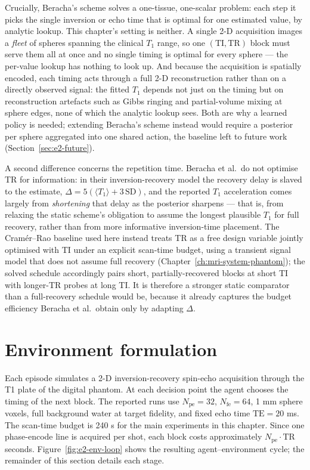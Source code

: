 Crucially, Beracha's scheme solves a one-tissue, one-scalar problem: each step
it picks the single inversion or echo time that is optimal for one estimated
value, by analytic lookup. This chapter's setting is neither. A single 2-D
acquisition images a \emph{fleet} of spheres spanning the clinical $T_1$ range,
so one $(\mathrm{TI},\mathrm{TR})$ block must serve them all at once and no
single timing is optimal for every sphere --- the per-value lookup has nothing
to look up. And because the acquisition is spatially encoded, each timing acts
through a full 2-D reconstruction rather than on a directly observed signal:
the fitted $T_1$ depends not just on the timing but on reconstruction artefacts
such as Gibbs ringing and partial-volume mixing at sphere edges, none of which
the analytic lookup sees. Both are why a learned policy is needed; extending
Beracha's scheme instead would require a posterior per sphere aggregated into
one shared action, the baseline left to future work (Section~\ref{sec:e2-future}).

A second difference concerns the repetition time. Beracha et al.\ do not
optimise TR for information: in their inversion-recovery model the recovery
delay is slaved to the estimate, $\Delta = 5(\langle T_1\rangle + 3\,\mathrm{SD})$,
and the reported $T_1$ acceleration comes largely from \emph{shortening} that
delay as the posterior sharpens --- that is, from relaxing the static scheme's
obligation to assume the longest plausible $T_1$ for full recovery, rather than
from more informative inversion-time placement. The Cram\'er--Rao baseline used
here instead treats TR as a free design variable jointly optimised with TI under
an explicit scan-time budget, using a transient signal model that does not
assume full recovery (Chapter~\ref{ch:mri-system-phantom}); the solved schedule
accordingly pairs short, partially-recovered blocks at short TI with longer-TR
probes at long TI. It is therefore a stronger static comparator than a
full-recovery schedule would be, because it already captures the budget
efficiency Beracha et al.\ obtain only by adapting $\Delta$.

\section{Environment formulation}
\label{sec:e2-env}

Each episode simulates a 2-D inversion-recovery spin-echo acquisition through
the T1 plate of the digital phantom. At each decision point the agent chooses
the timing of the next block. The reported runs use $N_\mathrm{pe}=32$,
$N_\mathrm{fe}=64$, 1 mm sphere voxels, full background water at target
fidelity, and fixed echo time $\mathrm{TE}=20$ ms. The scan-time budget is
240 s for the main experiments in this chapter. Since one phase-encode line is
acquired per shot, each block costs approximately
$N_\mathrm{pe}\cdot \mathrm{TR}$ seconds.
Figure~\ref{fig:e2-env-loop} shows the resulting agent--environment cycle;
the remainder of this section details each stage.

